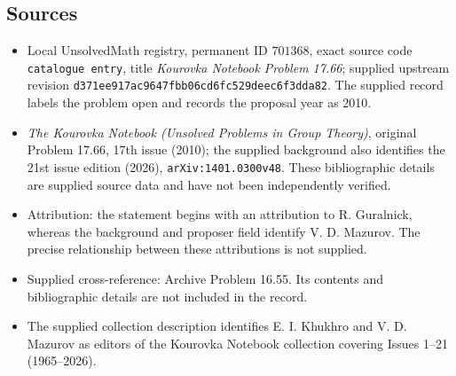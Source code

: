 \documentclass[11pt]{article}
\begin{document}
\subsection{Sources}
\begin{itemize}
\item Local UnsolvedMath registry, permanent ID \(701368\), exact source code \texttt{catalogue entry}, title \emph{Kourovka Notebook Problem 17.66}; supplied upstream revision \texttt{d371ee917ac9647fbb06cd6fc529deec6f3dda82}. The supplied record labels the problem open and records the proposal year as 2010.
\item \emph{The Kourovka Notebook (Unsolved Problems in Group Theory)}, original Problem 17.66, 17th issue (2010); the supplied background also identifies the 21st issue edition (2026), \texttt{arXiv:1401.0300v48}. These bibliographic details are supplied source data and have not been independently verified.
\item Attribution: the statement begins with an attribution to R. Guralnick, whereas the background and proposer field identify V. D. Mazurov. The precise relationship between these attributions is not supplied.
\item Supplied cross-reference: Archive Problem 16.55. Its contents and bibliographic details are not included in the record.
\item The supplied collection description identifies E. I. Khukhro and V. D. Mazurov as editors of the Kourovka Notebook collection covering Issues 1--21 (1965--2026).
\end{itemize}
\end{document}
